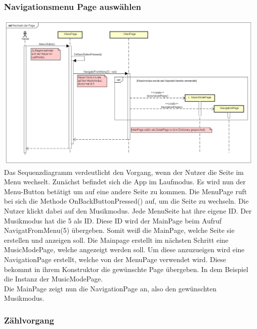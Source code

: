 \documentclass[a4paper,12pt]{article}
\begin{document}
\newpage
\subsubsection{Navigationsmenu Page auswählen}

\includegraphics[width=1.1\textwidth]{./Diagramme/NavigationsMenuSeqDia.png}\\
Das Sequenzdiagramm verdeutlicht den Vorgang, wenn der Nutzer die Seite im Menu wechselt.
Zunächst befindet sich die App im Laufmodus. Es wird nun der Menu-Button betätigt um auf eine andere Seite zu kommen. Die MenuPage ruft bei sich die Methode OnBackButtonPressed() auf, um die Seite zu wechseln. 
Die Nutzer klickt dabei auf den Musikmodus. Jede MenuSeite hat ihre eigene ID. Der Musikmodus hat die 5 als ID. Diese ID wird der MainPage beim Aufruf NavigatFromMenu(5) übergeben. Somit weiß die MainPage, welche Seite sie erstellen und anzeigen soll.
Die Mainpage erstellt im nächsten Schritt eine MusicModePage, welche angezeigt werden soll. Um diese anzuzueigen wird eine NavigationPage erstellt, welche von der MenuPage verwendet wird. Diese bekommt in ihrem Konstruktor die gewünschte Page übergeben. In dem Beispiel die Instanz der MusicModePage. \\
Die MainPage zeigt nun die NavigationPage an, also den gewünschten Musikmodus.


\subsubsection{Zählvorgang}
\end{document}
